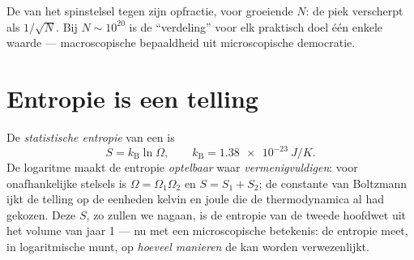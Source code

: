 \begin{omfigure}

{\small De  van het spinstelsel tegen zijn opfractie, voor
groeiende $N$: de piek verscherpt als $1/\sqrt N$. Bij $N \sim
10^{20}$ is
de ``verdeling'' voor elk praktisch doel één enkele waarde --- macroscopische
bepaaldheid uit microscopische democratie.}
\end{omfigure}

\section{Entropie is een telling}

\begin{definition}[Boltzmannentropie]\label{def:b3:microcanonical-ensemble:entropy}
De \emph{statistische entropie} van een  is
\[
S = k_{\text{B}}\ln\Omega , \qquad
k_{\text{B}} = \qty{1.38e-23}{J/K} .
\]
De logaritme maakt de entropie \emph{optelbaar} waar 
\emph{vermenigvuldigen}: voor onafhankelijke stelsels is $\Omega = \Omega_1\Omega_2$ en $S = S_1 + S_2$; de constante van Boltzmann ijkt de
telling op de eenheden kelvin en joule die de thermodynamica al had
gekozen. Deze $S$, zo zullen we nagaan, is de entropie van de tweede
hoofdwet uit het volume van jaar 1 --- nu met een microscopische
betekenis: de entropie meet, in logaritmische munt, op \emph{hoeveel
manieren} de  kan worden verwezenlijkt.
\end{definition}

